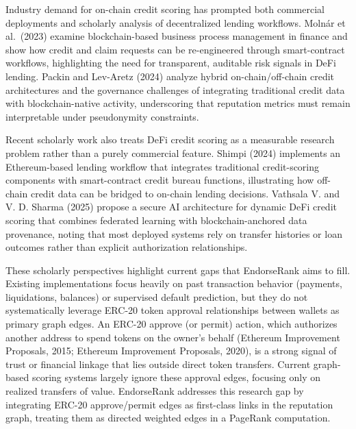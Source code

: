 Industry demand for on-chain credit scoring has prompted both commercial deployments and scholarly analysis of decentralized lending workflows. Moln\'{a}r et al.\ (2023) examine blockchain-based business process management in finance and show how credit and claim requests can be re-engineered through smart-contract workflows, highlighting the need for transparent, auditable risk signals in DeFi lending. Packin and Lev-Aretz (2024) analyze hybrid on-chain/off-chain credit architectures and the governance challenges of integrating traditional credit data with blockchain-native activity, underscoring that reputation metrics must remain interpretable under pseudonymity constraints.


Recent scholarly work also treats DeFi credit scoring as a measurable research problem rather than a purely commercial feature. Shimpi (2024) implements an Ethereum-based lending workflow that integrates traditional credit-scoring components with smart-contract credit bureau functions, illustrating how off-chain credit data can be bridged to on-chain lending decisions. Vathsala V. and V. D. Sharma (2025) propose a secure AI architecture for dynamic DeFi credit scoring that combines federated learning with blockchain-anchored data provenance, noting that most deployed systems rely on transfer histories or loan outcomes rather than explicit authorization relationships.


These scholarly perspectives highlight current gaps that EndorseRank aims to fill. Existing implementations focus heavily on past transaction behavior (payments, liquidations, balances) or supervised default prediction, but they do not systematically leverage ERC-20 token approval relationships between wallets as primary graph edges. An ERC-20 approve (or permit) action, which authorizes another address to spend tokens on the owner's behalf (Ethereum Improvement Proposals, 2015; Ethereum Improvement Proposals, 2020), is a strong signal of trust or financial linkage that lies outside direct token transfers. Current graph-based scoring systems largely ignore these approval edges, focusing only on realized transfers of value. EndorseRank addresses this research gap by integrating ERC-20 approve/permit edges as first-class links in the reputation graph, treating them as directed weighted edges in a PageRank computation.


